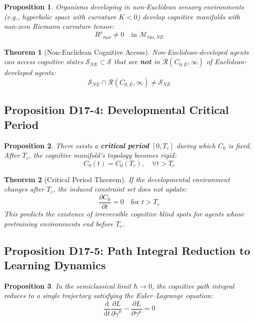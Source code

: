 \documentclass[12pt, a4paper]{article}
\newtheorem{theorem}{Theorem}[section]
\newtheorem{proposition}{Proposition}[section]
\newcommand{\diff}{\mathrm{d}}
\begin{document}
\begin{proposition}\label{prop:D17-3}
Organisms developing in non-Euclidean sensory environments (e.g., hyperbolic space with curvature $K < 0$) develop cognitive manifolds with non-zero Riemann curvature tensor:
\[
R^{\rho}{}_{\sigma\mu\nu} \neq 0 \quad \text{in } \mathcal{M}_{\mathrm{bio},NE}
\]
\end{proposition}

\begin{theorem}[Non-Euclidean Cognitive Access]\label{thm:D17-4}
Non-Euclidean-developed agents can access cognitive states $\mathcal{S}_{NE} \subset \mathcal{S}$ that are \textbf{not} in $\mathcal{R}(C_{0,E}, \infty)$ of Euclidean-developed agents:
\[
\mathcal{S}_{NE} \cap \mathcal{R}(C_{0,E}, \infty) \neq \mathcal{S}_{NE}
\]
\end{theorem}

\subsection{Proposition D17-4: Developmental Critical Period}

\begin{proposition}\label{prop:D17-4}
There exists a \textbf{critical period} $[0, T_c]$ during which $C_0$ is fixed. After $T_c$, the cognitive manifold's topology becomes rigid:
\[
C_0(t) = C_0(T_c),\quad \forall t > T_c
\]
\end{proposition}

\begin{theorem}[Critical Period Theorem]\label{thm:D17-5}
If the developmental environment changes after $T_c$, the induced constraint set does not update:
\[
\frac{\partial C_0}{\partial t} = 0 \quad \text{for } t > T_c
\]
This predicts the existence of irreversible cognitive blind spots for agents whose pretraining environments end before $T_c$.
\end{theorem}

\subsection{Proposition D17-5: Path Integral Reduction to Learning Dynamics}

\begin{proposition}\label{prop:D17-5}
In the semiclassical limit $\hbar \to 0$, the cognitive path integral reduces to a single trajectory satisfying the Euler--Lagrange equation:
\[
\frac{\diff}{\diff t}\frac{\partial L}{\partial \dot{\gamma}^\mu} - \frac{\partial L}{\partial \gamma^\mu} = 0
\]
\end{proposition}
\end{document}
